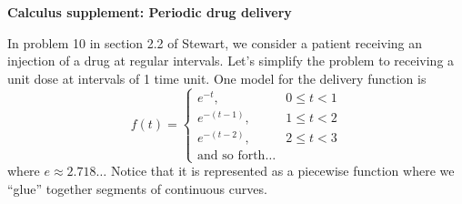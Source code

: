 \documentclass{article}
\begin{document}
\begin{center}
{\bf Calculus supplement: Periodic drug delivery}
\end{center}

In problem 10 in section 2.2 of Stewart, we consider a patient
receiving an injection of a drug at regular intervals.  Let's simplify
the problem to receiving a unit dose at intervals of 1 time unit.
One model for the delivery function is
\[
f(t) = \begin{cases}
e^{-t}, & 0 \leq t < 1 \\
e^{-(t-1)}, & 1 \leq t < 2 \\
e^{-(t-2)}, & 2 \leq t < 3 \\
\text{and so forth} \ldots 
\end{cases}
\]
where $e \approx 2.718\ldots$  Notice that it is
represented as a piecewise function where we ``glue'' together
segments of continuous curves.
\end{document}
